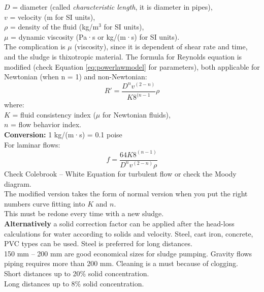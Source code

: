 \documentclass{article}
\numberwithin{equation}{section}
\begin{document}
$D$ = diameter (called \textit{characteristic length}, it is diameter in pipes),\\
$v$ = velocity (m for SI units),\\
$\rho$ = density of the fluid (kg/m$^3$ for SI units),\\
$\mu$ = dynamic viscosity (Pa·s or kg/(m·s) for SI units).\\
The complication is $\mu$ (viscosity), since it is dependent of shear rate and time, and the sludge is thixotropic material. The formula for Reynolds equation is modified (check Equation \ref{eq:powerlawmodel} for parameters), both applicable for Newtonian (when n = 1) and non-Newtonian:
\[
R' = \frac{D^nv^{(2-n)}}{K8^{(n-1}}\rho
\]
where:\\
$K$ = fluid consistency index ($\mu$ for Newtonian fluids),\\
$n$ = flow behavior index.\\
\textbf{Conversion:} 1 kg/(m·s) = 0.1 poise\\
For laminar flows:
\[
f = \frac{64K8^{(n-1)}}{D^nv^{(2-n)}\rho}
\]
Check Colebrook -- White Equation for turbulent flow or check the Moody diagram.\\
The modified version takes the form of normal version when you put the right numbers curve fitting into $K$ and $n$.\\
This must be redone every time with a new sludge.\\
\textbf{Alternatively} a solid correction factor can be applied after the head-loss calculations for water according to solids and velocity.
Steel, cast iron, concrete, PVC types can be used. Steel is preferred for long distances.\\
150 mm -- 200 mm are good economical sizes for sludge pumping. Gravity flows piping requires more than 200 mm. Cleaning is a must because of clogging.\\
Short distances up to 20\% solid concentration.\\
Long distances up to 8\% solid concentration.
\end{document}
